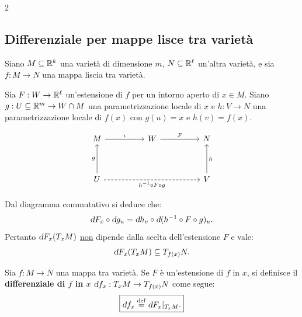 \begin{multicols*}{2}
    \subsection{Differenziale per mappe lisce tra varietà}

    \begin{remark}
        Siano $M \subseteq \mathbb{R}^k$ una varietà di dimensione $m$, $N \subseteq \mathbb{R}^\ell$
        un'altra varietà, e sia
        $f : M \to N$ una mappa liscia tra varietà. \smallskip

        Sia $F : W \to \mathbb{R}^\ell$ un'estensione di $f$ per un intorno aperto di
        $x \in M$. Siano $g : U \subseteq \mathbb{R}^m \to W \cap M$ una parametrizzazione
        locale di $x$ e $h : V \to N$ una parametrizzazione locale di $f(x)$ con
        $g(u) = x$ e $h(v) = f(x)$.

        \[\begin{tikzcd}
                M && W && N \\
                \\
                U &&&& V
                \arrow["\iota", from=1-1, to=1-3]
                \arrow["F", from=1-3, to=1-5]
                \arrow["g", from=3-1, to=1-1]
                \arrow["{h\inv \circ F \circ g}"', dashed, from=3-1, to=3-5]
                \arrow["h"', from=3-5, to=1-5]
            \end{tikzcd}\]

        Dal diagramma commutativo si deduce che:
        \[
            \dif F_x \circ \dif g_u = \dif h_v \circ \dif (h\inv \circ F \circ g)_u.
        \]
        Pertanto $\dif F_x(T_x M)$ \underline{non} dipende dalla scelta dell'estensione $F$ e vale:
        \[ \dif F_x(T_x M) \subseteq T_{f(x)} N. \]
    \end{remark}

    \begin{definition}
        Sia $f : M \to N$ una mappa tra varietà. Se $F$ è un'estensione di $f$
        in $x$, si definisce il \textbf{differenziale di $f$ in $x$}
        $\dif f_x : T_x M \to T_{f(x)} N$ come segue:
        \[
            \boxed{\dif f_x \defeq \restr{\dif F_x}{T_x M}.}
        \]
    \end{definition}


\end{multicols*}
